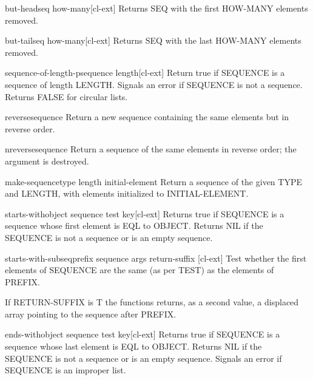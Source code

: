 \documentclass[10pt,english]{book}
\begin{document}
\begin{function}{but-head}{seq \op how-many}[cl-ext]
  Returns SEQ with the first HOW-MANY elements removed.
\end{function}

\begin{function}{but-tail}{seq \op how-many}[cl-ext]
  Returns SEQ with the last HOW-MANY elements removed.
\end{function}

\begin{function}{sequence-of-length-p}{sequence length}[cl-ext]
  Return true if SEQUENCE is a sequence of length LENGTH. Signals an error if
  SEQUENCE is not a sequence. Returns FALSE for circular lists.
\end{function}

\begin{function}{reverse}{sequence}
  Return a new sequence containing the same elements but in reverse order.
\end{function}

\begin{function}{nreverse}{sequence}
  Return a sequence of the same elements in reverse order; the argument
  is destroyed.
\end{function}

\begin{function}{make-sequence}{type length \key initial-element}
  Return a sequence of the given TYPE and LENGTH, with elements initialized
  to INITIAL-ELEMENT.
\end{function}

\begin{function}{starts-with}{object sequence \key test key}[cl-ext]
  Returns true if SEQUENCE is a sequence whose first element is EQL to OBJECT.
  Returns NIL if the SEQUENCE is not a sequence or is an empty sequence.
\end{function}

\begin{function}{starts-with-subseq}{prefix sequence \rest args \key return-suffix \akeys}[cl-ext]
  Test whether the first elements of SEQUENCE are the same (as per TEST) as the elements of PREFIX.

  If RETURN-SUFFIX is T the functions returns, as a second value, a
  displaced array pointing to the sequence after PREFIX.
\end{function}

\begin{function}{ends-with}{object sequence \key test key}[cl-ext]
  Returns true if SEQUENCE is a sequence whose last element is EQL to OBJECT.
  Returns NIL if the SEQUENCE is not a sequence or is an empty sequence. Signals
  an error if SEQUENCE is an improper list.
\end{function}
\end{document}
